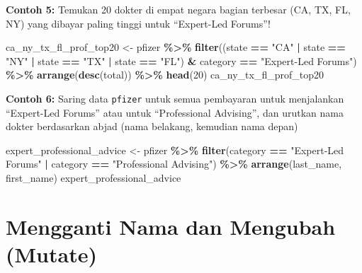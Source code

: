 \documentclass[
]{book}
\newenvironment{Shaded}{\begin{snugshade}}{\end{snugshade}}
\newcommand{\DecValTok}[1]{\textcolor[rgb]{0.00,0.00,0.81}{#1}}
\newcommand{\FunctionTok}[1]{\textcolor[rgb]{0.13,0.29,0.53}{\textbf{#1}}}
\newcommand{\NormalTok}[1]{#1}
\newcommand{\OtherTok}[1]{\textcolor[rgb]{0.56,0.35,0.01}{#1}}
\newcommand{\SpecialCharTok}[1]{\textcolor[rgb]{0.81,0.36,0.00}{\textbf{#1}}}
\newcommand{\StringTok}[1]{\textcolor[rgb]{0.31,0.60,0.02}{#1}}
\begin{document}
\textbf{Contoh 5:} Temukan 20 dokter di empat negara bagian terbesar (CA, TX, FL, NY) yang dibayar paling tinggi untuk ``Expert-Led Forums''!

\begin{Shaded}
\begin{Highlighting}[]
\NormalTok{ca\_ny\_tx\_fl\_prof\_top20 }\OtherTok{\textless{}{-}}\NormalTok{ pfizer }\SpecialCharTok{\%\textgreater{}\%}
  \FunctionTok{filter}\NormalTok{((state }\SpecialCharTok{==} \StringTok{"CA"} \SpecialCharTok{|} 
\NormalTok{          state }\SpecialCharTok{==} \StringTok{"NY"} \SpecialCharTok{|}
\NormalTok{          state }\SpecialCharTok{==} \StringTok{"TX"} \SpecialCharTok{|} 
\NormalTok{          state }\SpecialCharTok{==} \StringTok{"FL"}\NormalTok{) }\SpecialCharTok{\&}
\NormalTok{          category }\SpecialCharTok{==} \StringTok{"Expert{-}Led Forums"}\NormalTok{) }\SpecialCharTok{\%\textgreater{}\%}
  \FunctionTok{arrange}\NormalTok{(}\FunctionTok{desc}\NormalTok{(total)) }\SpecialCharTok{\%\textgreater{}\%}
  \FunctionTok{head}\NormalTok{(}\DecValTok{20}\NormalTok{)}
\NormalTok{ca\_ny\_tx\_fl\_prof\_top20}
\end{Highlighting}
\end{Shaded}

\textbf{Contoh 6:} Saring data \texttt{pfizer} untuk semua pembayaran untuk menjalankan ``Expert-Led Forums'' atau untuk ``Professional Advising'', dan urutkan nama dokter berdasarkan abjad (nama belakang, kemudian nama depan)

\begin{Shaded}
\begin{Highlighting}[]
\NormalTok{expert\_professional\_advice }\OtherTok{\textless{}{-}}\NormalTok{ pfizer }\SpecialCharTok{\%\textgreater{}\%}
  \FunctionTok{filter}\NormalTok{(category }\SpecialCharTok{==} \StringTok{"Expert{-}Led Forums"} \SpecialCharTok{|} 
\NormalTok{         category }\SpecialCharTok{==} \StringTok{"Professional Advising"}\NormalTok{) }\SpecialCharTok{\%\textgreater{}\%}
  \FunctionTok{arrange}\NormalTok{(last\_name, first\_name)}
\NormalTok{expert\_professional\_advice}
\end{Highlighting}
\end{Shaded}

\hypertarget{mengganti-nama-dan-mengubah-mutate}{%
\section{Mengganti Nama dan Mengubah (Mutate)}\label{mengganti-nama-dan-mengubah-mutate}}
\end{document}
